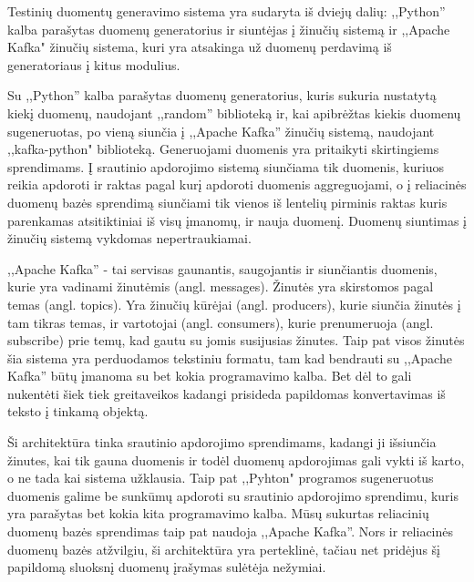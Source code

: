 \documentclass{VUMIFPSkursinis}
\begin{document}
Testinių duomentų generavimo sistema yra sudaryta iš dviejų dalių: ,,Python'' kalba parašytas duomenų generatorius ir siuntėjas į žinučių sistemą ir
,,Apache Kafka" žinučių sistema, kuri yra atsakinga už duomenų perdavimą iš generatoriaus į kitus modulius.\par
Su ,,Python'' kalba parašytas duomenų generatorius, kuris sukuria nustatytą kiekį duomenų, naudojant ,,random'' biblioteką ir, kai apibrėžtas kiekis duomenų sugeneruotas,
 po vieną siunčia į ,,Apache Kafka'' žinučių sistemą, naudojant ,,kafka-python" biblioteką. Generuojami duomenis yra pritaikyti skirtingiems sprendimams.
Į srautinio apdorojimo sistemą siunčiama tik duomenis, kuriuos reikia apdoroti ir raktas pagal kurį apdoroti duomenis aggreguojami, o į reliacinės duomenų
bazės sprendimą siunčiami tik vienos iš lentelių pirminis raktas kuris parenkamas atsitiktiniai iš visų įmanomų, ir nauja duomenį. Duomenų siuntimas į 
žinučių sistemą vykdomas nepertraukiamai.  \par

,,Apache Kafka'' - tai servisas gaunantis, saugojantis ir siunčiantis duomenis, kurie yra vadinami žinutėmis (angl. messages). Žinutės yra skirstomos pagal temas (angl. topics).
Yra žinučių kūrėjai (angl. producers), kurie siunčia žinutės į tam tikras temas, ir vartotojai (angl. consumers), kurie prenumeruoja (angl. subscribe)
prie temų, kad gautu su jomis susijusias žinutes\cite{thein2014apache}.  Taip pat visos žinutės šia sistema yra perduodamos tekstiniu formatu, 
tam kad bendrauti su ,,Apache Kafka'' būtų įmanoma su bet kokia programavimo kalba. Bet dėl to gali nukentėti šiek tiek greitaveikos kadangi prisideda
 papildomas konvertavimas iš teksto į tinkamą objektą.\par
Ši architektūra tinka srautinio apdorojimo sprendimams, kadangi ji išsiunčia žinutes,
kai tik gauna duomenis ir todėl duomenų apdorojimas gali vykti iš karto, o ne tada kai sistema užklausia. Taip pat ,,Pyhton" programos sugeneruotus duomenis galime
be sunkūmų apdoroti su srautinio apdorojimo sprendimu, kuris yra parašytas bet kokia kita programavimo kalba. 
Mūsų sukurtas reliacinių duomenų bazės sprendimas taip pat naudoja ,,Apache Kafka''. Nors ir reliacinės duomenų bazės atžvilgiu, ši architektūra yra perteklinė, 
tačiau net pridėjus šį papildomą sluoksnį duomenų įrašymas sulėtėja nežymiai.\par
\end{document}
